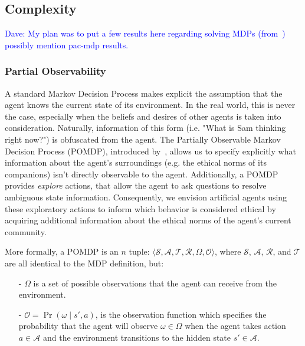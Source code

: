 \documentclass[11pt]{article}
\newcommand\davenote[1]{\textcolor{blue}{Dave: #1}}
\begin{document}
\subsection{Complexity}


\davenote{My plan was to put a few results here regarding solving MDPs (from~\cite{papadimitriou1987complexity,Littman1995}) possibly mention pac-mdp results.}



\subsubsection{Partial Observability}

A standard Markov Decision Process makes explicit the assumption that the agent knows the current state of its environment. In the real world, this is never the case, especially when the beliefs and desires of other agents is taken into consideration. Naturally, information of this form (i.e. "What is Sam thinking right now?") is obfuscated from the agent. The Partially Observable Markov Decision Process (POMDP), introduced by~\cite{kaelbling1998planning}, allows us to specify explicitly what information about the agent's surroundings (e.g. the ethical norms of its companions) isn't directly observable to the agent. Additionally, a POMDP provides {\it explore} actions, that allow the agent to ask questions to resolve ambiguous state information. Consequently, we envision artificial agents using these exploratory actions to inform which behavior is considered ethical by acquiring additional information about the ethical norms of the agent's current community.

More formally, a POMDP is an $n$ tuple: $\langle \mathcal{S},\mathcal{A},\mathcal{T},\mathcal{R},\Omega,\mathcal{O} \rangle$, where $\mathcal{S}$, $\mathcal{A}$, $\mathcal{R}$, and $\mathcal{T}$ are all identical to the MDP definition, but:
\begin{itemize}
\item[-] $\Omega$ is a set of possible observations that the agent can receive from the environment.
\item[-] $\mathcal{O} = \Pr(\omega \mid s', a)$, is the observation function which specifies the probability that the agent will observe $\omega \in \Omega$ when the agent takes action $a \in \mathcal{A}$ and the environment transitions to the hidden state $s' \in \mathcal{A}$.
\end{itemize}
\end{document}
